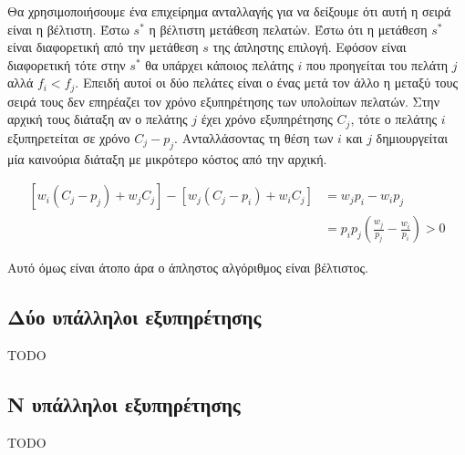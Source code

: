 Θα χρησιμοποιήσουμε ένα επιχείρημα ανταλλαγής για να δείξουμε ότι αυτή η σειρά
είναι η βέλτιστη. Έστω $s^{*}$ η βέλτιστη μετάθεση πελατών. Έστω ότι η μετάθεση
$s^{*}$ είναι διαφορετική από την μετάθεση $s$ της άπληστης επιλογή. Εφόσον είναι
διαφορετική τότε στην $s^{*}$ θα υπάρχει κάποιος πελάτης $i$ που προηγείται του
πελάτη $j$ αλλά $f_{i} < f_{j}$. Επειδή αυτοί οι δύο πελάτες είναι ο ένας μετά
τον άλλο η μεταξύ τους σειρά τους δεν επηρέαζει τον χρόνο εξυπηρέτησης των
υπολοίπων πελατών. Στην αρχική τους διάταξη αν ο πελάτης $j$ έχει χρόνο
εξυπηρέτησης $C_{j}$, τότε ο πελάτης $i$ εξυπηρετείται σε χρόνο $C_{j} -
p_{j}$. Ανταλλάσοντας τη θέση των $i$ και $j$ δημιουργείται μία καινούρια
διάταξη με μικρότερο κόστος από την αρχική.

\begin{equation} \label{eq1}
\begin{split}
  [w_{i}(C_{j} - p_{j}) + w_{j}C_{j}] - [w_{j}(C_{j} - p_{i}) + w_{i}C_{j}] & = w_{j}p_{i} - w_{i}p_{j} \\
                                                                            & = p_{i}p_{j}\left(\frac{w_{j}}{p_{j}} - \frac{w_{i}}{p_{i}}\right) > 0
\end{split}
\end{equation}

Αυτό όμως είναι άτοπο άρα ο άπληστος αλγόριθμος είναι βέλτιστος.


\subsection{Δύο υπάλληλοι εξυπηρέτησης}

TODO

\subsection{N υπάλληλοι εξυπηρέτησης}

TODO



